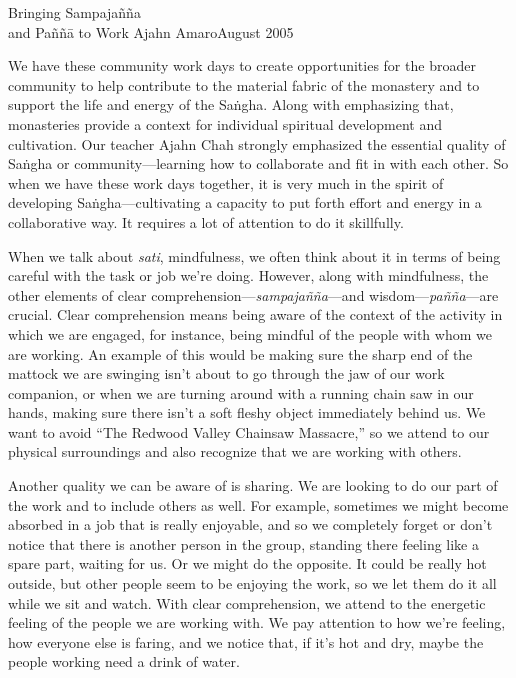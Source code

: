 {Bringing Sampajañña\\and Paññā to Work}
{Ajahn Amaro}{August 2005}

We have these community work days to create opportunities for the 
broader community to help contribute to the material fabric of the 
monastery and to support the life and energy of the Saṅgha. Along 
with emphasizing that, monasteries provide a context for individual 
spiritual development and cultivation. Our teacher Ajahn Chah strongly 
emphasized the essential quality of Saṅgha or community---learning 
how to collaborate and fit in with each other. So when we have these 
work days together, it is very much in the spirit of developing 
Saṅgha---cultivating a capacity to put forth effort and energy in a 
collaborative way. It requires a lot of attention to do it skillfully.

When we talk about \emph{sati}, mindfulness, we often think about it in 
terms of being careful with the task or job we're doing. However, along 
with mindfulness, the other elements of clear 
comprehension---\emph{sampajañña}---and wisdom---\emph{pañña}---are 
crucial. Clear comprehension means being aware of the context of the 
activity in which we are engaged, for instance, being mindful of the 
people with whom we are working. An example of this would be making 
sure the sharp end of the mattock we are swinging isn't about to go 
through the jaw of our work companion, or when we are turning around 
with a running chain saw in our hands, making sure there isn't a soft 
fleshy object immediately behind us. We want to avoid ``The Redwood 
Valley Chainsaw Massacre,'' so we attend to our physical surroundings 
and also recognize that we are working with others.

Another quality we can be aware of is sharing. We are looking to do our 
part of the work and to include others as well. For example, sometimes 
we might become absorbed in a job that is really enjoyable, and so we 
completely forget or don't notice that there is another person in the 
group, standing there feeling like a spare part, waiting for us. Or we 
might do the opposite. It could be really hot outside, but other people 
seem to be enjoying the work, so we let them do it all while we sit and 
watch. With clear comprehension, we attend to the energetic feeling of 
the people we are working with. We pay attention to how we're feeling, 
how everyone else is faring, and we notice that, if it's hot and dry, 
maybe the people working need a drink of water.

